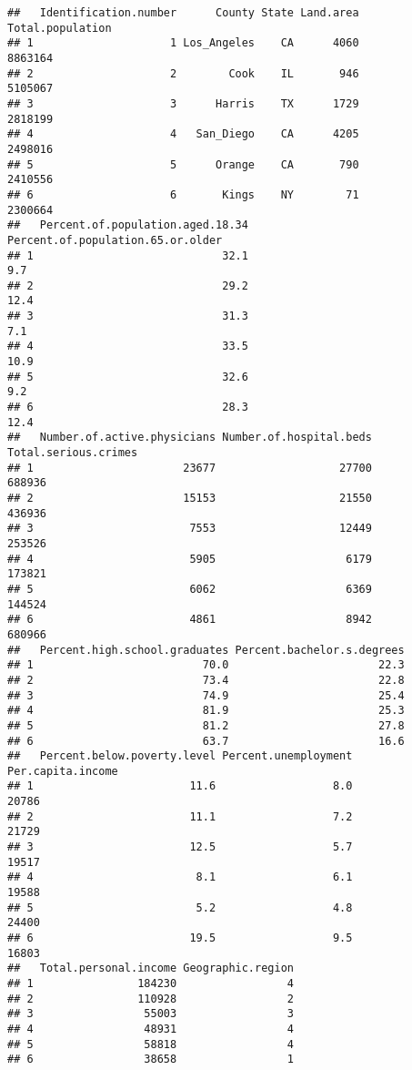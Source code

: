\documentclass[
]{article}
\begin{document}
\begin{verbatim}
##   Identification.number      County State Land.area Total.population
## 1                     1 Los_Angeles    CA      4060          8863164
## 2                     2        Cook    IL       946          5105067
## 3                     3      Harris    TX      1729          2818199
## 4                     4   San_Diego    CA      4205          2498016
## 5                     5      Orange    CA       790          2410556
## 6                     6       Kings    NY        71          2300664
##   Percent.of.population.aged.18.34 Percent.of.population.65.or.older
## 1                             32.1                               9.7
## 2                             29.2                              12.4
## 3                             31.3                               7.1
## 4                             33.5                              10.9
## 5                             32.6                               9.2
## 6                             28.3                              12.4
##   Number.of.active.physicians Number.of.hospital.beds Total.serious.crimes
## 1                       23677                   27700               688936
## 2                       15153                   21550               436936
## 3                        7553                   12449               253526
## 4                        5905                    6179               173821
## 5                        6062                    6369               144524
## 6                        4861                    8942               680966
##   Percent.high.school.graduates Percent.bachelor.s.degrees
## 1                          70.0                       22.3
## 2                          73.4                       22.8
## 3                          74.9                       25.4
## 4                          81.9                       25.3
## 5                          81.2                       27.8
## 6                          63.7                       16.6
##   Percent.below.poverty.level Percent.unemployment Per.capita.income
## 1                        11.6                  8.0             20786
## 2                        11.1                  7.2             21729
## 3                        12.5                  5.7             19517
## 4                         8.1                  6.1             19588
## 5                         5.2                  4.8             24400
## 6                        19.5                  9.5             16803
##   Total.personal.income Geographic.region
## 1                184230                 4
## 2                110928                 2
## 3                 55003                 3
## 4                 48931                 4
## 5                 58818                 4
## 6                 38658                 1
\end{verbatim}
\end{document}

